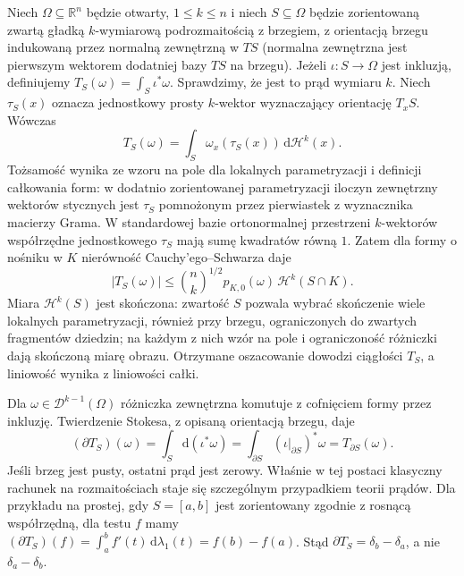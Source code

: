 \begin{przyklad}
Niech $\Omega\subseteq\mathbb R^n$ będzie
otwarty, $1\le k\le n$ i niech $S\subseteq\Omega$
będzie zorientowaną zwartą gładką
$k$-wymiarową podrozmaitością z brzegiem,
z orientacją brzegu indukowaną przez normalną
zewnętrzną w $TS$ (normalna zewnętrzna
jest pierwszym wektorem dodatniej bazy $TS$
na brzegu). Jeżeli $\iota:S\to\Omega$ jest
inkluzją, definiujemy
$T_S(\omega)=\int_S\iota^*\omega$.
Sprawdzimy, że jest to prąd wymiaru $k$.
Niech $\tau_S(x)$ oznacza jednostkowy prosty
$k$-wektor wyznaczający orientację $T_xS$.
Wówczas
\[
 T_S(\omega)=\int_S\omega_x(\tau_S(x))
 \,\mathrm d\mathcal H^k(x).
\]
Tożsamość wynika ze wzoru na pole dla lokalnych
parametryzacji i definicji całkowania form:
w dodatnio zorientowanej parametryzacji
iloczyn zewnętrzny wektorów stycznych jest
$\tau_S$ pomnożonym przez pierwiastek
z wyznacznika macierzy Grama.
W standardowej bazie ortonormalnej przestrzeni
$k$-wektorów współrzędne jednostkowego
$\tau_S$ mają sumę kwadratów równą $1$.
Zatem dla formy o nośniku w $K$
nierówność Cauchy'ego--Schwarza daje
\[
 |T_S(\omega)|
 \le\binom nk^{1/2}p_{K,0}(\omega)\,
 \mathcal H^k(S\cap K).
\]
Miara $\mathcal H^k(S)$ jest skończona:
zwartość $S$ pozwala wybrać skończenie wiele
lokalnych parametryzacji, również przy brzegu,
ograniczonych do zwartych fragmentów dziedzin;
na każdym z nich wzór na pole i ograniczoność
różniczki dają skończoną miarę obrazu.
Otrzymane oszacowanie dowodzi ciągłości $T_S$,
a liniowość wynika z liniowości całki.

Dla $\omega\in\mathcal D^{k-1}(\Omega)$
różniczka zewnętrzna komutuje z cofnięciem
formy przez inkluzję. Twierdzenie Stokesa,
z opisaną orientacją brzegu, daje
\[
 (\partial T_S)(\omega)
 =\int_S\mathrm d(\iota^*\omega)
 =\int_{\partial S}(\iota|_{\partial S})^*\omega
 =T_{\partial S}(\omega).
\]
Jeśli brzeg jest pusty, ostatni prąd jest zerowy.
Właśnie w tej postaci klasyczny rachunek na
rozmaitościach staje się szczególnym przypadkiem
teorii prądów. Dla przykładu na prostej,
gdy $S=[a,b]$ jest zorientowany zgodnie
z rosnącą współrzędną, dla testu $f$ mamy
$(\partial T_S)(f)=\int_a^b f'(t)\,
\mathrm d\lambda_1(t)=f(b)-f(a)$.
Stąd $\partial T_S=\delta_b-\delta_a$,
a nie $\delta_a-\delta_b$.
\end{przyklad}

